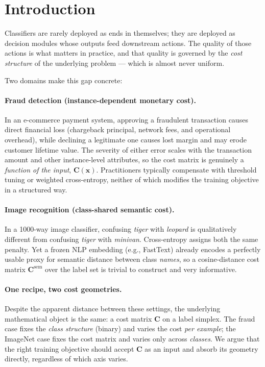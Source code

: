 \documentclass[sigconf,anonymous]{acmart}
\newcommand{\vx}{\mathbf{x}}
\newcommand{\mC}{\mathbf{C}}
\begin{document}
\section{Introduction}
Classifiers are rarely deployed as ends in themselves; they are deployed as decision modules whose outputs feed downstream actions. The quality of those actions is what matters in practice, and that quality is governed by the \emph{cost structure} of the underlying problem --- which is almost never uniform.

Two domains make this gap concrete:

\paragraph{Fraud detection (instance-dependent monetary cost).} In an e-commerce payment system, approving a fraudulent transaction causes direct financial loss (chargeback principal, network fees, and operational overhead), while declining a legitimate one causes lost margin and may erode customer lifetime value. The severity of either error scales with the transaction amount and other instance-level attributes, so the cost matrix is genuinely a \emph{function of the input}, $\mC(\vx)$. Practitioners typically compensate with threshold tuning or weighted cross-entropy, neither of which modifies the training objective in a structured way.

\paragraph{Image recognition (class-shared semantic cost).} In a 1000-way image classifier, confusing \emph{tiger} with \emph{leopard} is qualitatively different from confusing \emph{tiger} with \emph{minivan}. Cross-entropy assigns both the same penalty. Yet a frozen NLP embedding (e.g., FastText) already encodes a perfectly usable proxy for semantic distance between class \emph{names}, so a cosine-distance cost matrix $\mC^{\mathrm{sem}}$ over the label set is trivial to construct and very informative.

\paragraph{One recipe, two cost geometries.} Despite the apparent distance between these settings, the underlying mathematical object is the same: a cost matrix $\mC$ on a label simplex. The fraud case fixes the \emph{class structure} (binary) and varies the cost \emph{per example}; the ImageNet case fixes the cost matrix and varies only across \emph{classes}. We argue that the right training objective should accept $\mC$ as an input and absorb its geometry directly, regardless of which axis varies.
\end{document}
